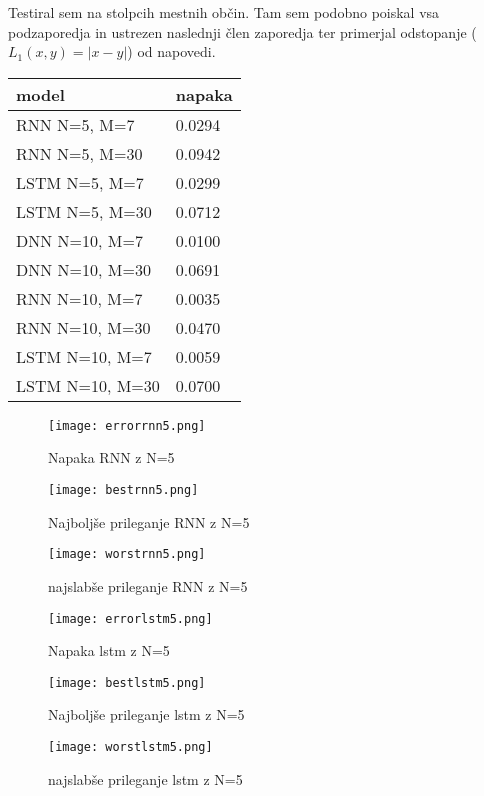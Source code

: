 \documentclass{article}
\begin{document}
Testiral sem na stolpcih mestnih občin. Tam sem podobno poiskal vsa podzaporedja in ustrezen naslednji člen zaporedja ter primerjal odstopanje (\(L_1(x,y)=\lvert x-y\rvert\)) od napovedi.

\begin{table}[]
    \begin{tabular}{@{}ll@{}}
    \toprule
    model           & napaka \\ \midrule
    RNN N=5, M=7    & 0.0294 \\
    RNN N=5, M=30   & 0.0942 \\
    LSTM N=5, M=7   & 0.0299 \\
    LSTM N=5, M=30  & 0.0712 \\
    DNN N=10, M=7   & 0.0100 \\
    DNN N=10, M=30  & 0.0691 \\
    RNN N=10, M=7   & 0.0035 \\
    RNN N=10, M=30  & 0.0470 \\
    LSTM N=10, M=7  & 0.0059 \\
    LSTM N=10, M=30 & 0.0700
    \end{tabular}
\end{table}


\begin{figure}[htb]
    \texttt{[image: errorrnn5.png]}
    \caption{Napaka RNN z N=5}
\end{figure}
\begin{figure}[htb]
    \texttt{[image: bestrnn5.png]}
    \caption{Najboljše prileganje RNN z N=5}
\end{figure}
\begin{figure}[htb]
    \texttt{[image: worstrnn5.png]}
    \caption{najslabše prileganje RNN z N=5}
\end{figure}

\begin{figure}[htb]
    \texttt{[image: errorlstm5.png]}
    \caption{Napaka lstm z N=5}
\end{figure}
\begin{figure}[htb]
    \texttt{[image: bestlstm5.png]}
    \caption{Najboljše prileganje lstm z N=5}
\end{figure}
\begin{figure}[htb]
    \texttt{[image: worstlstm5.png]}
    \caption{najslabše prileganje lstm z N=5}
\end{figure}
\end{document}
